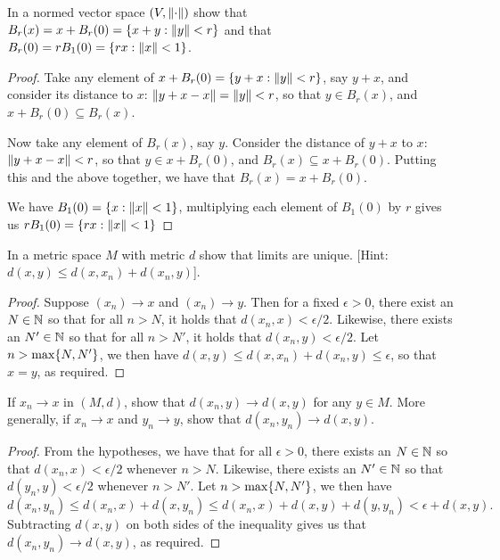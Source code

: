 \begin{exercise}{32}
In a normed vector space $(V,\left\lVert \cdot\right\rVert)$ show that $B_r(x)=x+B_r(0)=\{x+y:\left\lVert y\right\rVert<r\}$ and that $B_r(0)=rB_1(0)=\{rx:\left\lVert x\right\rVert<1\}$.
\end{exercise}
\begin{proof}
Take any element of $x+B_r(0)=\{y+x:\left\lVert y\right\rVert<r\}$, say $y+x$, and consider its distance to $x$: $\left\lVert y+x-x\right\rVert=\left\lVert y\right\rVert<r$, so that $y\in B_r(x)$, and $x+B_r(0)\subseteq B_r(x)$.

Now take any element of $B_r(x)$, say $y$. Consider the distance of $y+x$ to $x$: $\left\lVert y+x-x\right\rVert<r$, so that $y\in x+B_r(0)$, and $B_r(x)\subseteq x+B_r(0)$. Putting this and the above together, we have that $B_r(x)=x+B_r(0)$.

We have $B_1(0)=\{x:\left\lVert x\right\rVert<1\}$, multiplying each element of $B_1(0)$ by $r$ gives us $rB_1(0)=\{rx:\left\lVert x\right\rVert<1\}$
\end{proof} 

\begin{exercise}{33}
In a metric space $M$ with metric $d$ show that limits are unique. [Hint: $d(x,y)\leq d(x,x_n)+d(x_n,y)$].
\end{exercise}
\begin{proof}
Suppose $(x_n)\to x$ and $(x_n)\to y$. Then for a fixed $\epsilon>0$, there exist an $N\in\mathbb{N}$ so that for all $n>N$, it holds that $d(x_n,x)<\epsilon/2$. Likewise, there exists an $N'\in\mathbb{N}$ so that for all $n>N'$, it holds that $d(x_n,y)<\epsilon/2$. Let $n>\max\{N,N'\}$, we then have $d(x,y)\leq d(x,x_n)+d(x_n,y)\leq \epsilon$, so that $x=y$, as required.
\end{proof} 

\begin{exercise}{34}
If $x_n\to x$ in $(M,d)$, show that $d(x_n,y)\to d(x,y)$ for any $y\in M$. More generally, if $x_n\to x$ and $y_n\to y$, show that $d(x_n,y_n)\to d(x,y)$.
\end{exercise}
\begin{proof}
From the hypotheses, we have that for all $\epsilon>0$, there exists an $N\in\mathbb{N}$ so that $d(x_n,x)<\epsilon/2$ whenever $n>N$. Likewise, there exists an $N'\in\mathbb{N}$ so that $d(y_n,y)<\epsilon/2$ whenever $n>N'$. Let $n>\max\{N,N'\}$, we then have 
\[
d(x_n,y_n) 
\leq d(x_n,x)+d(x,y_n) 
\leq d(x_n,x)+d(x,y)+d(y,y_n)
<\epsilon+d(x,y).
\]
Subtracting $d(x,y)$ on both sides of the inequality gives us that $d(x_n,y_n)\to d(x,y)$, as required.
\end{proof} 

